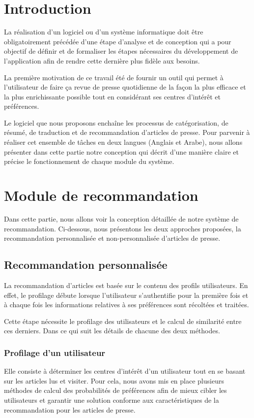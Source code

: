 
\newpage
\section{Introduction}
La réalisation d'un logiciel ou d'un système informatique doit être obligatoirement précédée d'une étape d'analyse et de conception qui a pour objectif de définir et de formaliser les étapes nécessaires du développement de l'application afin de rendre cette dernière plus fidèle aux besoins.

La première motivation de ce travail été de fournir un outil qui permet à l'utilisateur de faire ça revue de presse quotidienne de la façon la plus efficace et la plus enrichissante possible tout en considérant ses centres d'intérêt et préférences. 

Le logiciel que nous proposons enchaîne les processus de catégorisation, de résumé, de traduction et de recommandation d'articles de presse. Pour parvenir à réaliser cet ensemble de tâches en deux langues (Anglais et Arabe), nous allons présenter dans cette partie notre conception qui décrit d'une manière claire et précise le fonctionnement de chaque module du système. 


\section{Module de recommandation}
Dans cette partie, nous allons voir la conception détaillée de notre système de recommandation. Ci-dessous, nous présentons les deux approches proposées, la recommandation personnalisée et non-personnalisée d'articles de presse.
    \subsection{Recommandation personnalisée\label{personal}}
    La recommandation d'articles est basée sur le contenu des profils utilisateurs. En effet, le profilage débute lorsque l'utilisateur s'authentifie pour la première fois et à chaque fois les informations relatives à ses préférences sont récoltées et traitées.

    Cette étape nécessite le profilage des utilisateurs et le calcul de similarité entre ces derniers. Dans ce qui suit les détails de chacune des deux méthodes.

        \subsubsection{Profilage d'un utilisateur}
        Elle consiste à déterminer les centres d'intérêt d'un utilisateur tout en se basant sur les articles lus et visiter. Pour cela, nous avons mis en place plusieurs méthodes de calcul des probabilités de préférences afin de mieux cibler les utilisateurs et garantir une solution conforme aux caractéristiques de la recommandation pour les articles de presse. 

